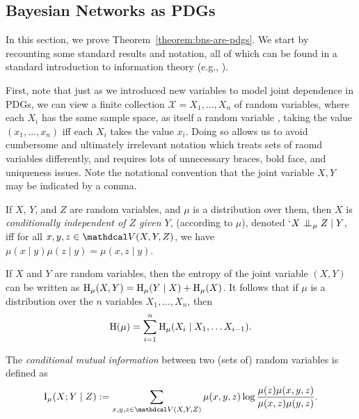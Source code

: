 \begin{subappendices}
\subsection{Bayesian Networks as PDGs}
In this section, we prove Theorem~\ref{theorem:bns-are-pdgs}.  
We start by recounting some standard results and notation, all of
which can be found in a standard introduction to information
theory (e.g., \cite[Chapter 1]{mackay2003information}).  

First, note that just as we introduced new variables to model joint dependence
in PDGs, we can view a finite collection $\mathcal X=X_1, \ldots, X_n$ of random
variables, where each $X_i$ has the same sample space, as itself a random
variable%
, taking the value $(x_1, \ldots, x_n)$ iff each $X_i$ takes the value $x_i$.
Doing so allows us to avoid cumbersome and ultimately irrelevant notation which treats sets of raomd variables differently, and requires lots of unnecessary braces, bold face, and uniqueness issues. 
Note the notational convention that the joint variable $X,Y$ may be indicated by a comma.

\begin{defn}\label{defn:cond-indep}
    If $X$, $Y$, and $Z$ are random variables,
    and $\mu$ is a distribution over them, 
    then ${X}$ is \emph{conditionally independent of ${Z}$ given ${Y}$}, 
       (according to $\mu$),  denoted `${ X} \mathrel{\perp\mspace{-10mu}\perp}_\mu { Z}
        \mid { Y}$, iff for all ${ x}, { y}, { z} \in
        \V({X}, { Y},{ Z})$, we
        have $\mu({ x} \mid { y}) \mu({ z} \mid { y}) =
        \mu({ x,z} \mid { y})$.
\end{defn}

\begin{fact}\label{fact:entropy-chain-rule}
    If $X$ and $Y$ are random variables, then the entropy of the joint
   variable $(X,Y)$ can be written as $\operatorname{\mathrm{H}}_\mu(X,Y) = 
\operatorname{\mathrm{H}}_\mu( Y \mid X) + \operatorname{\mathrm{H}}_\mu(X)$.
It follows that if $\mu$ is a
       distribution over the $n$ variables $X_1, \ldots, X_n$,  then
	\[ \operatorname{\mathrm{H}}(\mu) = \sum_{i = 1}^n \operatorname{\mathrm{H}}_\mu(X_i \mid X_1, \ldots X_{i-1}). \]
\end{fact}
\begin{defn}\label{defn:cmi}
   The \emph{conditional mutual information} between two (sets of) random
    variables is defined as  
    \[ \I_\mu(X ; Y \mid Z) := \sum_{x,y,z \in \V(X,Y,Z)} \mu(x,y,z)
        \log\frac{\mu(z) \mu(x,y,z)}{\mu(x,z)\mu(y,z)}. \] 
\end{defn}



\end{subappendices}
